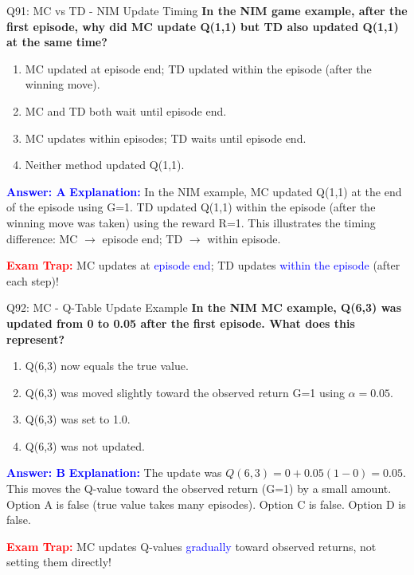 \documentclass[8pt]{beamer}
\begin{document}
	\begin{frame}{Q91: MC vs TD - NIM Update Timing}
		\fontsize{6.5}{7.5}\selectfont
		\textbf{In the NIM game example, after the first episode, why did MC update Q(1,1) but TD also updated Q(1,1) at the same time?}
		
		\begin{enumerate}
			\item MC updated at episode end; TD updated within the episode (after the winning move).
			\item MC and TD both wait until episode end.
			\item MC updates within episodes; TD waits until episode end.
			\item Neither method updated Q(1,1).
		\end{enumerate}
		
		\vspace{0.1cm}
		\textcolor{blue}{\textbf{Answer: A}}
		\vspace{0.1cm}
		\textcolor{blue}{\textbf{Explanation:}} In the NIM example, MC updated Q(1,1) at the end of the episode using G=1. TD updated Q(1,1) within the episode (after the winning move was taken) using the reward R=1. This illustrates the timing difference: MC $\rightarrow$ episode end; TD $\rightarrow$ within episode.
		
		\textcolor{red}{\textbf{Exam Trap:}} MC updates at \textcolor{blue}{episode end}; TD updates \textcolor{blue}{within the episode} (after each step)!
	\end{frame}
	
	\begin{frame}{Q92: MC - Q-Table Update Example}
		\fontsize{6.5}{7.5}\selectfont
		\textbf{In the NIM MC example, Q(6,3) was updated from 0 to 0.05 after the first episode. What does this represent?}
		
		\begin{enumerate}
			\item Q(6,3) now equals the true value.
			\item Q(6,3) was moved slightly toward the observed return G=1 using $\alpha=0.05$.
			\item Q(6,3) was set to 1.0.
			\item Q(6,3) was not updated.
		\end{enumerate}
		
		\vspace{0.1cm}
		\textcolor{blue}{\textbf{Answer: B}}
		\vspace{0.1cm}
		\textcolor{blue}{\textbf{Explanation:}} The update was $Q(6,3) = 0 + 0.05(1 - 0) = 0.05$. This moves the Q-value toward the observed return (G=1) by a small amount. Option A is false (true value takes many episodes). Option C is false. Option D is false.
		
		\textcolor{red}{\textbf{Exam Trap:}} MC updates Q-values \textcolor{blue}{gradually} toward observed returns, not setting them directly!
	\end{frame}
	
\end{document}
